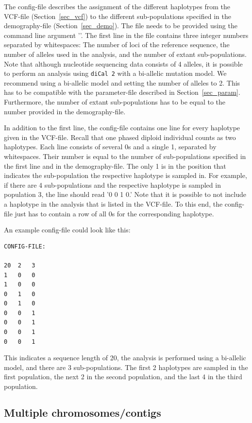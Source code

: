 \documentclass{article}
\numberwithin{equation}{section}
\begin{document}
The config-file describes the assignment of the different haplotypes from the VCF-file (Section~\ref{sec_vcf}) to the different sub-populations specified in the demography-file (Section~\ref{sec_demo}). The file needs to be provided using the command line argument '\texttt{}'. The first line in the file contains three integer numbers separated by whitespaces: The number of loci of the reference sequence, the number of alleles used in the analysis, and the number of extant sub-populations. Note that although nucleotide sequencing data consists of 4 alleles, it is possible to perform an analysis using \texttt{diCal 2} with a bi-allelic mutation model. We recommend using a bi-allelic model and setting the number of alleles to 2. This has to be compatible with the parameter-file described in Section~\ref{sec_param}. Furthermore, the number of extant sub-populations has to be equal to the number provided in the demography-file.

In addition to the first line, the config-file contains one line for every haplotype given in the VCF-file. Recall that one phased diploid individual counts as two haplotypes. Each line consists of several 0s and a single 1, separated by whitespaces. Their number is equal to the number of sub-populations specified in the first line and in the demography-file. The only 1 is in the position that indicates the sub-population the respective haplotype is sampled in. For example, if there are 4 sub-populations and the respective haplotype is sampled in population 3, the line should read '0 0 1 0.' Note that it is possible to not include a haplotype in the analysis that is listed in the VCF-file. To this end, the config-file just has to contain a row of all 0s for the corresponding haplotype.

An example config-file could look like this:
\begin{verbatim}
CONFIG-FILE:

20	2	3
1	0	0
1	0	0
0	1	0
0	1	0
0	0	1
0	0	1
0	0	1
0	0	1
\end{verbatim}
This indicates a sequence length of 20, the analysis is performed using a bi-allelic model, and there are 3 sub-populations. The first 2 haplotypes are sampled in the first population, the next 2 in the second population, and the last 4 in the third population.

\subsection{Multiple chromosomes/contigs}
\label{sec_contigs}
\end{document}
